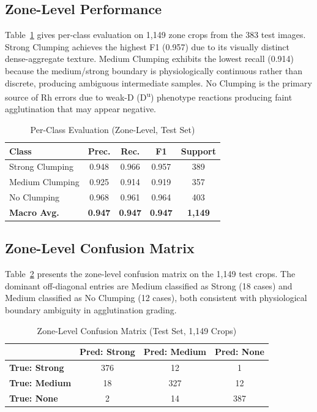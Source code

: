 \documentclass[conference]{IEEEtran}
\begin{document}
\subsection{Zone-Level Performance}

Table~\ref{tab:perclass} gives per-class evaluation on 1,149 zone
crops from the 383 test images.
Strong Clumping achieves the highest F1 (0.957) due to its visually
distinct dense-aggregate texture.
Medium Clumping exhibits the lowest recall (0.914) because the
medium/strong boundary is physiologically continuous rather than
discrete, producing ambiguous intermediate samples.
No Clumping is the primary source of Rh errors due to weak-D
(D\textsuperscript{u}) phenotype reactions producing faint
agglutination that may appear negative.

\begin{table}[htbp]
  \caption{Per-Class Evaluation (Zone-Level, Test Set)}
  \label{tab:perclass}
  \centering
  \renewcommand{\arraystretch}{1.1}
  \begin{tabular}{lcccc}
    \toprule
    \textbf{Class} & \textbf{Prec.} & \textbf{Rec.} &
    \textbf{F1} & \textbf{Support} \\
    \midrule
    Strong Clumping & 0.948 & 0.966 & 0.957 & 389 \\
    Medium Clumping & 0.925 & 0.914 & 0.919 & 357 \\
    No Clumping     & 0.968 & 0.961 & 0.964 & 403 \\
    \midrule
    \textbf{Macro Avg.} & \textbf{0.947} & \textbf{0.947} &
    \textbf{0.947} & \textbf{1,149} \\
    \bottomrule
  \end{tabular}
\end{table}

\subsection{Zone-Level Confusion Matrix}

Table~\ref{tab:confusion} presents the zone-level confusion matrix
on the 1,149 test crops.
The dominant off-diagonal entries are Medium classified as Strong
(18 cases) and Medium classified as No Clumping (12 cases), both
consistent with physiological boundary ambiguity in agglutination
grading.

\begin{table}[htbp]
  \caption{Zone-Level Confusion Matrix (Test Set, 1,149 Crops)}
  \label{tab:confusion}
  \centering
  \renewcommand{\arraystretch}{1.1}
  \begin{tabular}{lccc}
    \toprule
    & \textbf{Pred: Strong} & \textbf{Pred: Medium} & \textbf{Pred: None} \\
    \midrule
    \textbf{True: Strong} & 376 & 12 & 1 \\
    \textbf{True: Medium} & 18  & 327 & 12 \\
    \textbf{True: None}   & 2   & 14  & 387 \\
    \bottomrule
  \end{tabular}
\end{table}
\end{document}
